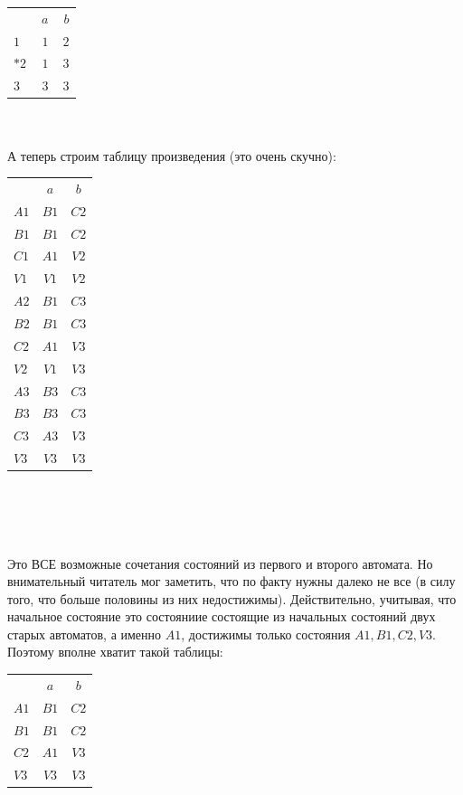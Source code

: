 \documentclass[14pt]{extreport}
\begin{document}
		\begin{tabular}{lrr}
			 & $\ a$ & $\ b$ \\
			 $1$ & $1$ & $2$ \\
			 $*2$ & $1$ & $3$ \\
			 $3$ & $3$ & $3$ \\
		\end{tabular}\\\\
	А теперь строим таблицу произведения (это очень скучно):\\
		\begin{tabular}{lcc}
			 & $a$ & $b$ \\
			 $A1$ & $B1$ & $C2$ \\
			 $B1$ & $B1$ & $C2$ \\
			 $C1$ & $A1$ & $V2$ \\
			 $V1$ & $V1$ & $V2$ \\
			 $A2$ & $B1$ & $C3$ \\
			 $B2$ & $B1$ & $C3$ \\
			 $C2$ & $A1$ & $V3$ \\
			 $V2$ & $V1$ & $V3$ \\
			 $A3$ & $B3$ & $C3$ \\
			 $B3$ & $B3$ & $C3$ \\
			 $C3$ & $A3$ & $V3$ \\
			 $V3$ & $V3$ & $V3$ \\
		\end{tabular}\\\\\\\\
	Это ВСЕ возможные сочетания состояний из первого и второго автомата. Но внимательный читатель
	мог заметить, что по факту нужны далеко не все (в силу того, что больше половины из них
	недостижимы). Действительно, учитывая, что начальное состояние это состояниие состоящие
	из начальных состояний двух старых автоматов, а именно $A1$, достижимы только состояния
	$A1,B1,C2,V3$.\\
	Поэтому вполне хватит такой таблицы:\\
		\begin{tabular}{lcc}
			 & $a$ & $b$ \\
			 $A1$ & $B1$ & $C2$ \\
			 $B1$ & $B1$ & $C2$ \\
			 $C2$ & $A1$ & $V3$ \\
			 $V3$ & $V3$ & $V3$ \\
		\end{tabular}\\\\
\end{document}

